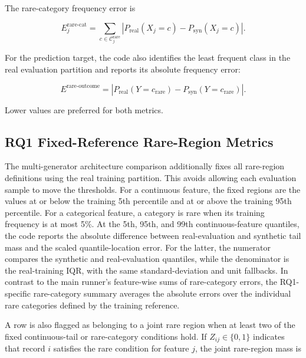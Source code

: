 The rare-category frequency error is

\begin{equation}
    E_j^{\mathrm{rare\mbox{-}cat}} =
        \sum_{c\in\mathcal{C}^{\mathrm{rare}}_j}
        \left|P_{\mathrm{real}}(X_j=c)
        -P_{\mathrm{syn}}(X_j=c)\right|.
    \label{eq:evaluation_rare_category}
\end{equation}

For the prediction target, the code also identifies the least frequent class
in the real evaluation partition and reports its absolute frequency error:

\begin{equation}
    E^{\mathrm{rare\mbox{-}outcome}} =
        \left|P_{\mathrm{real}}(Y=c_{\mathrm{rare}})
        -P_{\mathrm{syn}}(Y=c_{\mathrm{rare}})\right|.
    \label{eq:evaluation_rare_outcome}
\end{equation}

Lower values are preferred for both metrics.

\subsection{RQ1 Fixed-Reference Rare-Region Metrics}
\label{subsec:rq1_rare_regions}

The multi-generator architecture comparison additionally fixes all rare-region
definitions using the real training partition. This avoids allowing each
evaluation sample to move the thresholds. For a continuous feature, the fixed
regions are the values at or below the training 5th percentile and at or above
the training 95th percentile. For a categorical feature, a category is rare
when its training frequency is at most 5\%. At the 5th, 95th, and 99th
continuous-feature quantiles, the code reports the absolute difference between
real-evaluation and synthetic tail mass and the scaled quantile-location error.
For the latter, the numerator compares the synthetic and real-evaluation
quantiles, while the denominator is the real-training IQR, with the same
standard-deviation and unit fallbacks. In contrast to the main runner's
feature-wise sums of rare-category errors, the RQ1-specific rare-category
summary averages the absolute errors over the individual rare categories
defined by the training reference.

A row is also flagged as belonging to a joint rare region when at least two of
the fixed continuous-tail or rare-category conditions hold. If
$Z_{ij}\in\{0,1\}$ indicates that record $i$ satisfies the rare condition
for feature $j$, the
joint rare-region mass is

